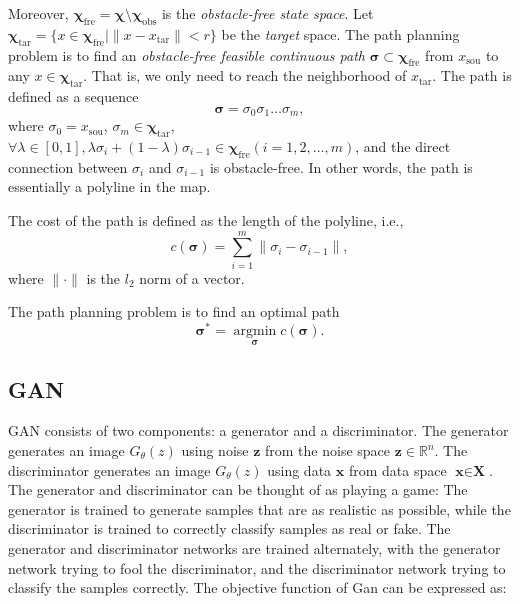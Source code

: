 \documentclass[smallcondensed]{svjour3}     %
\begin{document}
Moreover, $\bm{\chi}_{\textrm{fre}} = \bm{\chi} \setminus \bm{\chi}_{\textrm{obs}}$ is the \emph{obstacle-free state space}.
Let $\bm{\chi}_{\textrm{tar}} = \{x \in \bm{\chi}_{\textrm{fre}} \vert \lVert x - x_{\textrm{tar}} \rVert < r\}$ be the \emph{target} space.
The path planning problem is to find an \emph{obstacle-free feasible continuous path} $\bm{\sigma} \subset \bm{\chi}_{\textrm{fre}}$ from $x_{\textrm{sou}}$ to any $x \in \bm{\chi}_{\textrm{tar}}$.
That is, we only need to reach the neighborhood of $x_{\textrm{tar}}$.
The path is defined as a sequence
\begin{equation}\label{equation: path}
	\bm{\sigma} = \sigma_0 \sigma_1 \dots \sigma_m,
\end{equation}
where $\sigma_0 = x_{\textrm{sou}}$, $\sigma_m \in \bm{\chi}_{\textrm{tar}}$,
$\forall \lambda \in [0, 1], \lambda \sigma_i + (1 - \lambda)\sigma_{i - 1} \in \bm{\chi}_{\textrm{fre}} (i = 1, 2, \dots, m)$, and
	the direct connection between $\sigma_i$ and $\sigma_{i - 1}$ is obstacle-free.
In other words, the path is essentially a polyline in the map.

The cost of the path is defined as the length of the polyline, i.e.,
\begin{equation}\label{equation: path-cost}
	c(\bm{\sigma}) = \sum_{i=1}^{m} \lVert \sigma_i - \sigma_{i - 1} \rVert,
\end{equation}
where $\lVert \cdot \rVert$ is the $l_2$ norm of a vector.

The path planning problem is to find an optimal path
\begin{equation}\label{equation: optimal-path}
	\bm{\sigma}^* = \mathop{\arg\min} \limits_{\bm{\sigma}} c(\bm{\sigma}).
\end{equation}

\subsection{GAN}
GAN consists of two components: a generator and a discriminator.
The generator generates an image $G_\theta (z)$ using noise $\textbf{z}$ from the noise space $\textbf{z} \in \mathbb{R}^n $.
The discriminator generates an image $G_\theta (z)$ using data $\textbf{x}$ from data space $\textbf{x} \in \textbf{X}$.
The generator and discriminator can be thought of as playing a game:
The generator is trained to generate samples that are as realistic as possible, while the discriminator is trained to correctly classify samples as real or fake.
The generator and discriminator networks are trained alternately, with the generator network trying to fool the discriminator, and the discriminator network trying to classify the samples correctly.
The objective function of Gan can be expressed as:
\end{document}
